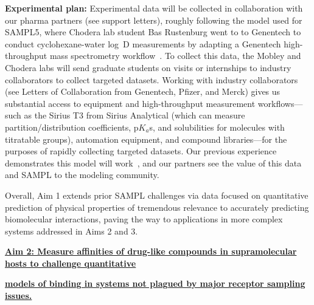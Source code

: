 \documentclass[11pt]{article}
\begin{document}
{\bf Experimental plan:}
Experimental data will be collected in collaboration with our pharma partners (see support letters), roughly following the model used for SAMPL5, where Chodera lab student Bas Rustenburg went to to Genentech to conduct cyclohexane-water log~D measurements by adapting a Genentech high-throughput mass spectrometry workflow~\cite{rustenburg_measuring_2016}.
To collect this data, the Mobley and Chodera labs will send graduate students on visits or internships to industry collaborators to collect targeted datasets.
Working with industry collaborators (see Letters of Collaboration from Genentech, Pfizer, and Merck) gives us substantial access to equipment and high-throughput measurement workflows---such as the Sirius T3 from Sirius Analytical (which can measure partition/distribution coefficients, p$K_a$s, and solubilities for molecules with titratable groups), automation equipment, and compound libraries---for the purposes of rapidly collecting targeted datasets.
Our previous experience demonstrates this model will work~\cite{rustenburg_measuring_2016}, and our partners see the value of this data and SAMPL to the modeling community.

Overall, Aim 1 extends prior SAMPL challenges via data focused on quantitative prediction of physical properties of tremendous relevance to accurately predicting biomolecular interactions, paving the way to applications in more complex systems addressed in Aims 2 and 3.

\textbf{\underline{Aim 2: Measure affinities of drug-like compounds in supramolecular hosts to challenge quantitative}}

\textbf{\underline{models of binding in systems not plagued by major receptor sampling issues.}}
\end{document}
